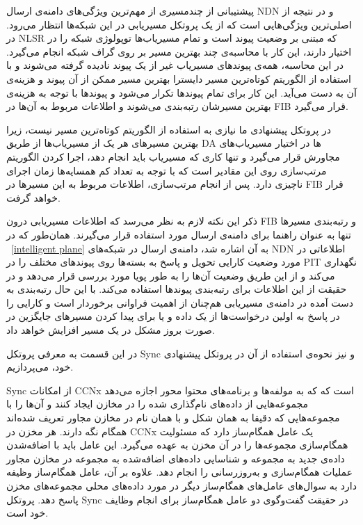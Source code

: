 \label{multipach}

پیشتیبانی از چندمسیری از مهم‌ترین ویژگی‌های دامنه‌ی ارسال NDN و در نتیجه از اصلی‌ترین ویژگی‌هایی است که از یک پروتکل مسیریابی در این شبکه‌ها انتظار می‌رود. در NLSR که مبتنی بر وضعیت پیوند است و تمام مسیریاب‌ها توپولوژی شبکه را در اختیار دارند، این کار با محاسبه‌ی چند بهترین مسیر بر روی گراف شبکه انجام می‌گیرد. در این محاسبه، همه‌ی پیوندهای مسیریاب غیر از یک پیوند نادیده گرفته می‌شوند و با استفاده از الگوریتم کوتاه‌ترین مسیر دایسترا بهترین مسیر ممکن از آن پیوند و هزینه‌ی آن به دست می‌آید. این کار برای تمام پیوندها تکرار می‌شود و پیوندها با توجه به هزینه‌ی بهترین مسیرشان رتبه‌بندی می‌شوند و اطلاعات مربوط به آن‌ها در FIB قرار می‌گیرد. 

در پروتکل پیشنهادی ما نیازی به استفاده از الگوریتم کوتاه‌ترین مسیر نیست، زیرا بهترین مسیرهای هر یک از مسیریاب‌ها از طریق DA ها در اختیار مسیریاب‌های مجاورش قرار می‌گیرد و تنها کاری که مسیریاب باید انجام دهد، اجرا کردن الگوریتم مرتب‌سازی روی این مقادیر است که با توجه به تعداد کم همسایه‌ها زمان اجرای ناچیزی دارد. پس از انجام مرتب‌سازی، اطلاعات مربوط به این مسیرها در FIB  قرار خواهد گرفت.

ذکر این نکته لازم به نظر می‌رسد که اطلاعات مسیریابی درون FIB و رتبه‌بندی مسیر‌ها تنها به عنوان راهنما برای دامنه‌ی ارسال مورد استفاده قرار می‌گیرند. همان‌طور که در ~\ref{intelligent plane} به آن اشاره شد، دامنه‌ی ارسال در شبکه‌های NDN اطلاعاتی در مورد وضعیت کارایی تحویل و پاسخ به بسته‌ها روی پیوند‌های مختلف را در PIT نگهداری می‌کند و از این طریق وضعیت آن‌ها را به طور پویا مورد بررسی قرار  می‌دهد و در حقیقت از این اطلاعات برای رتبه‌بندی پیوندها استفاده می‌کند. با این حال رتبه‌بندی به دست آمده در دامنه‌ی مسیریابی هم‌چنان از اهمیت فراوانی برخوردار است و کارایی را در پاسخ به اولین درخواست‌ها از یک داده و یا برای پیدا کردن مسیرهای جایگزین در صورت بروز مشکل در یک مسیر افزایش خواهد داد.

\label{sync}
در این قسمت به معرفی پروتکل Sync و نیز نحوه‌ی استفاده از آن در پروتکل پیشنهادی خود، می‌پردازیم.

Sync
 از امکانات CCNx است که که به مولفه‌ها و برنامه‌های محتوا محور اجازه می‌دهد مجموعه‌هایی از داده‌های نام‌گذاری شده را در مخازن ایجاد کنند و آن‌ها را با مجموعه‌هایی که دقیقا به همان شکل و با همان نام در مخازن مجاور تعریف شده‌اند همگام نگه دارند. هر مخزن در CCNx یک عامل همگام‌ساز دارد که مسئولیت همگام‌سازی مجموعه‌ها را در آن مخزن به عهده می‌گیرد. این عامل باید با اضافه‌شدن داده‌ی جدید به مجموعه و شناسایی داده‌های اضافه‌شده به مجموعه در مخازن مجاور عملیات همگام‌سازی و به‌روزرسانی را انجام دهد. علاوه بر آن، عامل همگام‌ساز وظیفه دارد به سوال‌های عامل‌های همگام‌ساز دیگر در مورد داده‌های محلی مجموعه‌های مخزن پاسخ دهد. پروتکل Sync در حقیقت گفت‌وگوی دو عامل همگام‌ساز برای انجام وظایف خود است.

